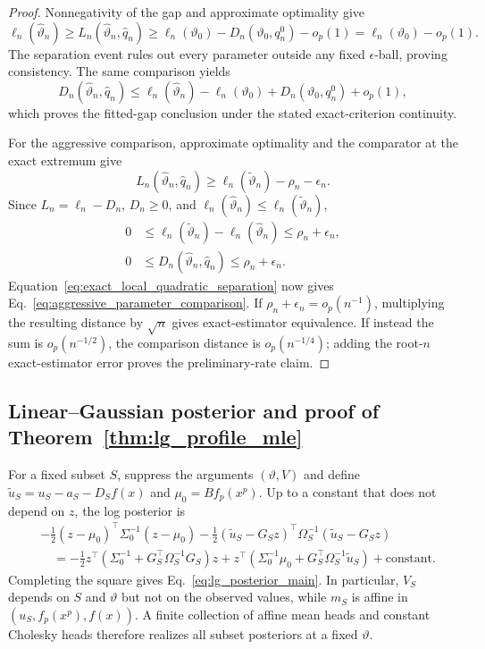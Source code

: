\begin{proof}
Nonnegativity of the gap and approximate optimality give
\[
 \ell_n(\widehat\vartheta_n)
 \geq L_n(\widehat\vartheta_n,\widehat q_n)
 \geq \ell_n(\vartheta_0)-D_n(\vartheta_0,q_n^0)-o_p(1)
 =\ell_n(\vartheta_0)-o_p(1).
\]
The separation event rules out every parameter outside any fixed
$\epsilon$-ball, proving consistency.  The same comparison yields
\[
 D_n(\widehat\vartheta_n,\widehat q_n)
 \leq \ell_n(\widehat\vartheta_n)-\ell_n(\vartheta_0)
      +D_n(\vartheta_0,q_n^0)+o_p(1),
\]
which proves the fitted-gap conclusion under the stated exact-criterion
continuity.

For the aggressive comparison, approximate optimality and the comparator at
the exact extremum give
\[
 L_n(\widehat\vartheta_n,\widehat q_n)
 \geq \ell_n(\widetilde\vartheta_n)-\rho_n-\epsilon_n.
\]
Since $L_n=\ell_n-D_n$, $D_n\geq0$, and
$\ell_n(\widehat\vartheta_n)\leq\ell_n(\widetilde\vartheta_n)$,
\begin{align*}
 0&\leq\ell_n(\widetilde\vartheta_n)
          -\ell_n(\widehat\vartheta_n)
    \leq\rho_n+\epsilon_n,\\
 0&\leq D_n(\widehat\vartheta_n,\widehat q_n)
    \leq\rho_n+\epsilon_n.
\end{align*}
Equation~\eqref{eq:exact_local_quadratic_separation} now gives
Eq.~\eqref{eq:aggressive_parameter_comparison}.  If
$\rho_n+\epsilon_n=o_p(n^{-1})$, multiplying the resulting distance by
$\sqrt n$ gives exact-estimator equivalence.  If instead the sum is
$o_p(n^{-1/2})$, the comparison distance is $o_p(n^{-1/4})$; adding the
root-$n$ exact-estimator error proves the preliminary-rate claim.
\end{proof}

\subsection{Linear--Gaussian posterior and proof of
Theorem~\ref{thm:lg_profile_mle}}

For a fixed subset $S$, suppress the arguments $(\vartheta,V)$ and define
$\widetilde u_S=u_S-a_S-D_Sf(x)$ and $\mu_0=Bf_p(x^p)$.  Up to a constant
that does not depend on $z$, the log posterior is
\begin{align*}
 &-\frac12(z-\mu_0)^\top\Sigma_0^{-1}(z-\mu_0)
 -\frac12(\widetilde u_S-G_Sz)^\top
 \Omega_S^{-1}(\widetilde u_S-G_Sz)\\
 &\quad=-\frac12z^\top
 (\Sigma_0^{-1}+G_S^\top\Omega_S^{-1}G_S)z
 +z^\top(\Sigma_0^{-1}\mu_0+G_S^\top\Omega_S^{-1}
 \widetilde u_S)+\text{constant}.
\end{align*}
Completing the square gives Eq.~\eqref{eq:lg_posterior_main}.  In particular,
$V_S$ depends on $S$ and $\vartheta$ but not on the observed values, while
$m_S$ is affine in $(u_S,f_p(x^p),f(x))$.  A finite collection of affine
mean heads and constant Cholesky heads therefore realizes all subset
posteriors at a fixed $\vartheta$.

